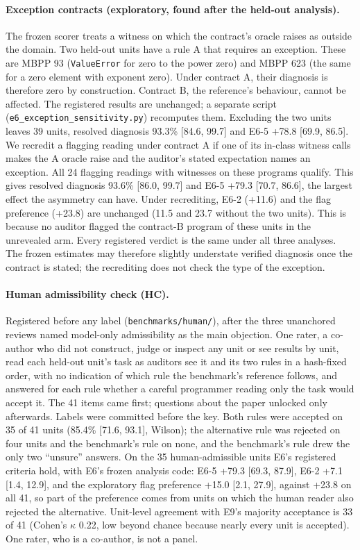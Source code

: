 \paragraph{Exception contracts (exploratory, found after the held-out analysis).} The frozen scorer
treats a witness on which the contract's oracle raises as outside the domain. Two held-out units have a
rule A that requires an exception. These are MBPP 93 (\texttt{ValueError} for zero to the power zero) and
MBPP 623 (the same for a zero element with exponent zero). Under contract A, their diagnosis is therefore
zero by construction. Contract B, the reference's behaviour, cannot be affected. The registered results
are unchanged; a separate script (\texttt{e6\_exception\_sensitivity.py}) recomputes them. Excluding the
two units leaves 39 units, resolved diagnosis 93.3\% [84.6, 99.7] and E6-5 +78.8 [69.9, 86.5]. We
recredit a flagging reading under contract A if one of its in-class witness calls makes the A oracle
raise and the auditor's stated expectation names an exception. All 24 flagging readings with witnesses on
these programs qualify. This gives resolved diagnosis 93.6\% [86.0, 99.7] and E6-5 +79.3 [70.7, 86.6],
the largest effect the asymmetry can have. Under recrediting, E6-2 (+11.6) and the flag preference
(+23.8) are unchanged (11.5 and 23.7 without the two units). This is because no auditor flagged the
contract-B program of these units in the unrevealed arm. Every registered verdict is the same under all
three analyses. The frozen estimates may therefore slightly understate verified diagnosis once the contract
is stated; the recrediting does not check the type of the exception.

\paragraph{Human admissibility check (HC).} Registered before any label (\texttt{benchmarks/human/}), after the three
unanchored reviews named model-only admissibility as the main objection. One rater, a co-author who did not construct,
judge or inspect any unit or see results by unit, read each held-out unit's task as auditors see it and its two rules
in a hash-fixed order, with no indication of which rule the benchmark's reference follows, and answered for each
rule whether a careful programmer reading only the task would accept it. The 41 items came first; questions about
the paper unlocked only afterwards. Labels were committed before the key. Both rules were accepted on 35 of 41 units
(85.4\% [71.6, 93.1], Wilson); the alternative rule was rejected on four units and the benchmark's rule on none, and
the benchmark's rule drew the only two ``unsure'' answers. On the 35 human-admissible units E6's registered criteria
hold, with E6's frozen analysis code: E6-5 +79.3 [69.3, 87.9], E6-2 +7.1 [1.4, 12.9], and the exploratory flag
preference +15.0 [2.1, 27.9], against +23.8 on all 41, so part of the preference comes from units on which the human
reader also rejected the alternative. Unit-level agreement with E9's majority acceptance is 33 of 41 (Cohen's
$\kappa$ 0.22, low beyond chance because nearly every unit is accepted). One rater, who is a co-author, is not a panel.

